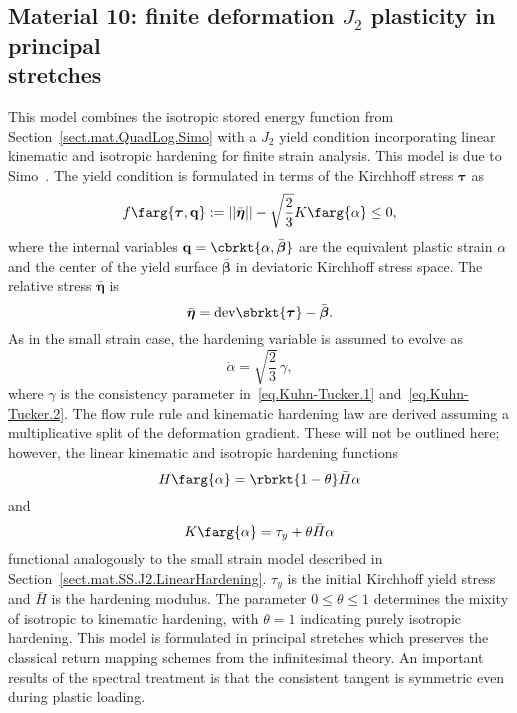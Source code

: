 \subsection[Material 10: finite deformation $J_{2}$ plasticity in 
principal stretches]
{Material 10: finite deformation $J_{2}$ plasticity in 
principal\\ stretches}
\label{sect.mat.J2.QL.LinearHardening}
This model combines the isotropic stored energy function from 
Section~\ref{sect.mat.QuadLog.Simo} with
a $J_{2}$ yield condition incorporating
linear kinematic and 
isotropic hardening for finite strain analysis. 
This model is due to Simo~\cite{Simo1992}.
The yield condition is formulated in terms of the
Kirchhoff stress $\boldsymbol{\tau}$ as
\begin{equation}
	f\farg{\boldsymbol{\tau}, \mathbf{q}} := 
	||\bar{\boldsymbol{\eta}}|| 
	- \sqrt{\frac{2}{3}} K\farg{\alpha} \le 0,
\end{equation}
where the internal variables 
$\mathbf{q} = \cbrkt{\alpha, \bar{\boldsymbol{\beta}}}$ are
the equivalent plastic strain $\alpha$ and the center of
the yield surface $\bar{\boldsymbol{\beta}}$ in deviatoric
Kirchhoff stress space. The relative stress $\bar{\boldsymbol{\eta}}$ is
\begin{equation}
\bar{\boldsymbol{\eta}} = \textrm{dev}\sbrkt{\boldsymbol\tau} - 
\bar{\boldsymbol{\beta}}.
\end{equation}
As in the small strain case, the hardening variable is assumed
to evolve as
\begin{equation}
\dot{\alpha} = \sqrt{\frac{2}{3}}\,\gamma,	
\end{equation}
where $\gamma$ is the consistency parameter 
in~\eqref{eq.Kuhn-Tucker.1} and~\eqref{eq.Kuhn-Tucker.2}.
The flow rule rule and kinematic hardening law are derived
assuming a multiplicative split of the deformation gradient.
These will not be outlined here; however,
the linear kinematic and isotropic hardening functions
\begin{equation}
	H\farg{\alpha} = \rbrkt{1 - \theta} \bar{H} \alpha
\end{equation}
and
\begin{equation}
	K\farg{\alpha} = \tau_{y} + \theta \bar{H} \alpha
\end{equation}
functional analogously to the small strain model described
in Section~\ref{sect.mat.SS.J2.LinearHardening}.
$\tau_{y}$ is the initial Kirchhoff yield stress and
$\bar{H}$ is the hardening modulus.
The parameter $0 \le \theta \le 1$ determines the mixity of 
isotropic to kinematic hardening, with $\theta = 1$ indicating purely 
isotropic hardening.
This model is formulated in principal stretches which preserves the 
classical return mapping schemes from the infinitesimal theory. An 
important results of the spectral treatment is that the consistent 
tangent is symmetric even during plastic loading.

